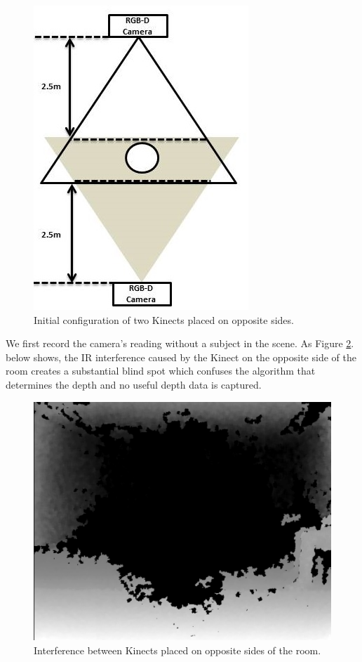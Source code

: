 \documentclass[10pt]{article}
\begin{document}
\begin{figure}[H]
\centering
\includegraphics[scale=0.4]{figure_2cameras_opposite.jpg}
\caption{Initial configuration of two Kinects placed on opposite sides.}
\label{2_cameras_config1}
\end{figure}

We first record the camera's reading without a subject in the scene. As Figure \ref{IR_interference}. below shows, the IR interference caused by the Kinect on the opposite side of the room creates a substantial blind spot which confuses the algorithm that determines the depth and no useful depth data is captured.

\begin{figure}[H]
\centering
\includegraphics[scale=0.2]{IR_Interference2.jpg}
\caption{Interference between Kinects placed on opposite sides of the room.}
\label{IR_interference}
\end{figure}
\end{document}
